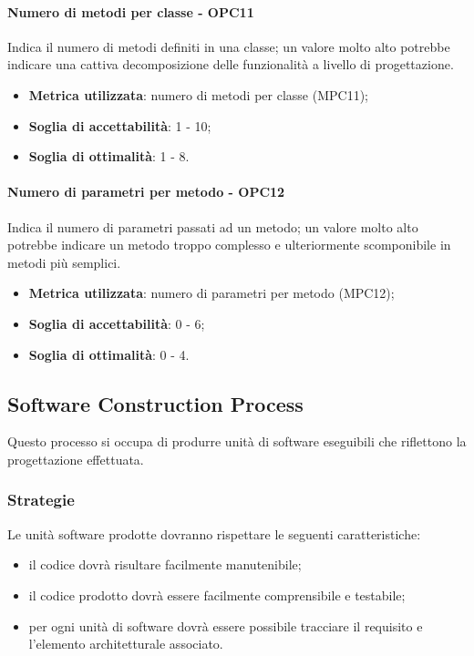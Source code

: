 \documentclass[PianoDiQualifica.tex]{subfiles}
\begin{document}
			\paragraph{Numero di metodi per classe - OPC11}
			Indica il numero di metodi definiti in una classe; un valore molto alto potrebbe indicare una cattiva decomposizione delle funzionalità a livello di progettazione.
			\begin{itemize}
				\item \textbf{Metrica utilizzata}: numero di metodi per classe (MPC11);
				\item \textbf{Soglia di accettabilità}: 1 - 10;
				\item \textbf{Soglia di ottimalità}: 1 - 8.
			\end{itemize}
			
			\paragraph{Numero di parametri per metodo - OPC12}
			Indica il numero di parametri passati ad un metodo; un valore molto alto potrebbe indicare un
			metodo troppo complesso e ulteriormente scomponibile in metodi più semplici.
			\begin{itemize}
				\item \textbf{Metrica utilizzata}: numero di parametri per metodo (MPC12);
				\item \textbf{Soglia di accettabilità}: 0 - 6;
				\item \textbf{Soglia di ottimalità}: 0 - 4.
			\end{itemize}
		
	\subsection{Software Construction Process}
		Questo processo si occupa di produrre unità di software eseguibili che riflettono la progettazione effettuata.
		
		\subsubsection{Strategie}
			Le unità software prodotte dovranno rispettare le seguenti caratteristiche:
			\begin{itemize}
				\item il codice dovrà risultare facilmente manutenibile;
				\item il codice prodotto dovrà essere facilmente comprensibile e testabile;
				\item per ogni unità di software dovrà essere possibile tracciare il requisito e l'elemento architetturale associato.
			\end{itemize}
			
\end{document}
